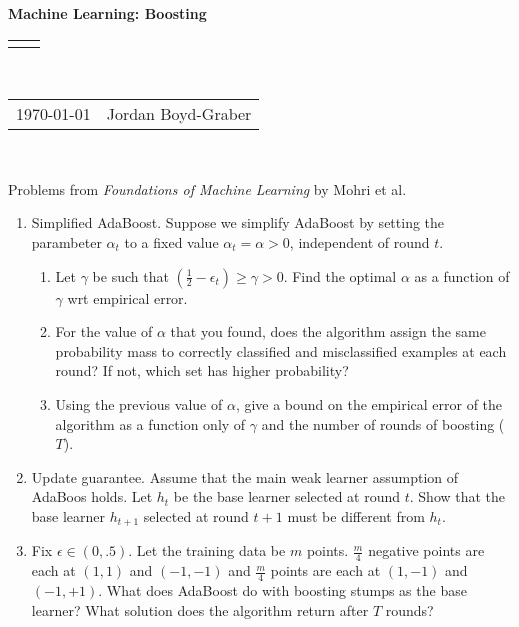 \documentclass[12pt]{article}
\renewcommand{\title}[1]{\textbf{#1}\\}
\renewcommand{\line}{\begin{tabularx}{\textwidth}{X>{\raggedleft}X}\hline\\\end{tabularx}\\[-0.5cm]}
\newcommand{\leftright}[2]{\begin{tabularx}{\textwidth}{X>{\raggedleft}X}#1%
& #2\\\end{tabularx}\\[-0.5cm]}
\begin{document}
\title{Machine Learning: Boosting}
\line
\leftright{\today}{Jordan Boyd-Graber} %

\begin{center}
  Problems from \emph{Foundations of Machine Learning} by Mohri et al.
\end{center}

\begin{enumerate}
  \item Simplified AdaBoost.  Suppose we simplify AdaBoost by setting the
    parambeter $\alpha_t$ to a fixed value $\alpha_t = \alpha> 0$, independent of
    round $t$.
    \begin{enumerate}
      \item Let $\gamma$ be such that $\left(\frac{1}{2} - \epsilon_t \right)
        \geq \gamma > 0$.  Find the optimal $\alpha$ as a function of $\gamma$
        wrt empirical error.

     \item For the value of $\alpha$ that you found, does the algorithm assign
       the same probability mass to correctly classified and misclassified
       examples at each round?  If not, which set has higher probability?

     \item Using the previous value of $\alpha$, give a bound on the empirical
       error of the algorithm as a function only of $\gamma$ and the number of
       rounds of boosting ($T$).
    \end{enumerate}

    \item Update guarantee.  Assume that the main weak learner assumption of
      AdaBoos holds.  Let $h_t$ be the base learner selected at round $t$.  Show
      that the base learner $h_{t+1}$ selected at round $t+1$ must be different
      from $h_t$.

    \item Fix $\epsilon \in (0, .5)$.  Let the training data be $m$ points.
      $\frac{m}{4}$ negative points are each at $(1,1)$ and $(-1, -1)$ and
      $\frac{m}{4}$ points are each at $(1, -1)$ and $(-1, +1)$.  What does
      AdaBoost do with boosting stumps as the base learner?  What solution does
      the algorithm return after $T$ rounds?

\end{enumerate}
\end{document}
